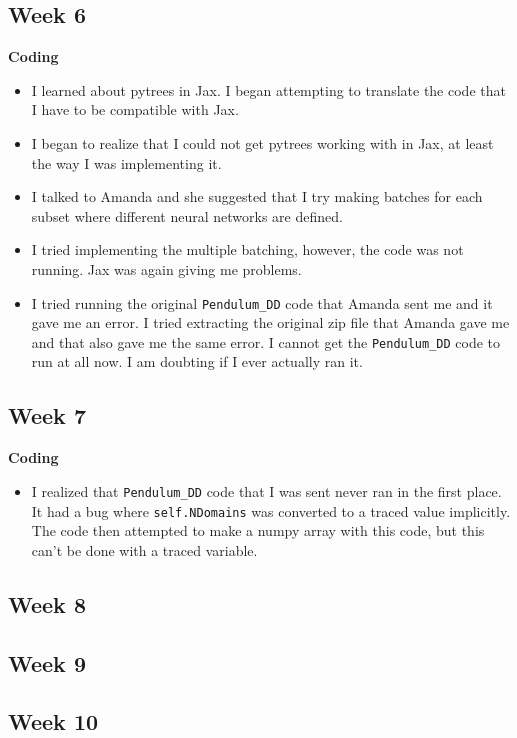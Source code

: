 \documentclass{article}
\begin{document}
\subsection*{Week 6}
\textbf{Coding}
\begin{itemize}
\item I learned about pytrees in Jax. I began attempting to translate the code that I have to be compatible with Jax.
\item I began to realize that I could not get pytrees working with in Jax, at least the way I was implementing it.
\item I talked to Amanda and she suggested that I try making batches for each subset where different neural networks are defined.
\item I tried implementing the multiple batching, however, the code was not running. Jax was again giving me problems.
\item I tried running the original \verb|Pendulum_DD| code that Amanda sent me and it gave me an error. I tried extracting the original zip file that Amanda gave me and that also gave me the same error. I cannot get the \verb|Pendulum_DD| code to run at all now. I am doubting if I ever actually ran it.
\end{itemize}
\newpage
\subsection*{Week 7}
\textbf{Coding}
\begin{itemize}
\item I realized that \verb|Pendulum_DD| code that I was sent never ran  in the first place. It had a bug where \verb|self.NDomains| was converted to a traced value implicitly. The code then attempted to make a numpy array with this code, but this can't be done with a traced variable.
\end{itemize}
\newpage 
\subsection*{Week 8} 
\newpage
\subsection*{Week 9}
\newpage
\subsection*{Week 10}  
\newpage
\end{document}
